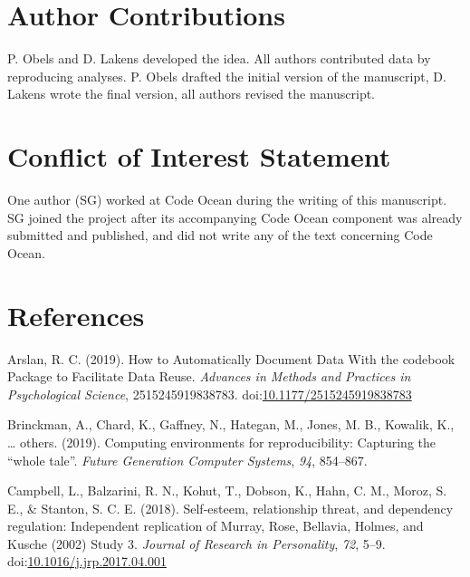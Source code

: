 \documentclass[
  ,jou, a4paper,floatsintext]{apa6}
\begin{document}
\hypertarget{author-contributions}{%
\section{Author Contributions}\label{author-contributions}}

P. Obels and D. Lakens developed the idea. All authors contributed data by reproducing analyses. P. Obels drafted the initial version of the manuscript, D. Lakens wrote the final version, all authors revised the manuscript.

\hypertarget{conflict-of-interest-statement}{%
\section{Conflict of Interest Statement}\label{conflict-of-interest-statement}}

One author (SG) worked at Code Ocean during the writing of this manuscript. SG joined the project after its accompanying Code Ocean component was already submitted and published, and did not write any of the text concerning Code Ocean.

\hypertarget{references}{%
\section{References}\label{references}}

\setlength{\parindent}{-0.5in}
\setlength{\leftskip}{0.5in}

\hypertarget{refs}{}
\leavevmode\hypertarget{ref-arslan_how_2019}{}%
Arslan, R. C. (2019). How to Automatically Document Data With the codebook Package to Facilitate Data Reuse. \emph{Advances in Methods and Practices in Psychological Science}, 2515245919838783. doi:\href{https://doi.org/10.1177/2515245919838783}{10.1177/2515245919838783}

\leavevmode\hypertarget{ref-brinckman2019computing}{}%
Brinckman, A., Chard, K., Gaffney, N., Hategan, M., Jones, M. B., Kowalik, K., \ldots{} others. (2019). Computing environments for reproducibility: Capturing the ``whole tale''. \emph{Future Generation Computer Systems}, \emph{94}, 854--867.

\leavevmode\hypertarget{ref-campbell_self-esteem_2018}{}%
Campbell, L., Balzarini, R. N., Kohut, T., Dobson, K., Hahn, C. M., Moroz, S. E., \& Stanton, S. C. E. (2018). Self-esteem, relationship threat, and dependency regulation: Independent replication of Murray, Rose, Bellavia, Holmes, and Kusche (2002) Study 3. \emph{Journal of Research in Personality}, \emph{72}, 5--9. doi:\href{https://doi.org/10.1016/j.jrp.2017.04.001}{10.1016/j.jrp.2017.04.001}
\end{document}
